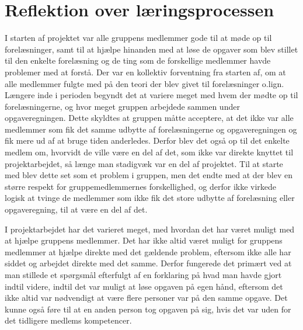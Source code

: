 \section{Reflektion over læringsprocessen}\label{Reflektion-over-laeringsprocessen}
I starten af projektet var alle gruppens medlemmer gode til at møde op til forelæsninger, samt til at hjælpe hinanden med at løse de opgaver som blev stillet til den enkelte forelæsning og de ting som de forskellige medlemmer havde problemer med at forstå. Der var en kollektiv forventning fra starten af, om at alle medlemmer fulgte med på den teori der blev givet til forelæsninger o.lign. Længere inde i perioden begyndt det at variere meget med hvem der mødte op til forelæsningerne, og hvor meget gruppen arbejdede sammen under opgaveregningen. Dette skyldtes at gruppen måtte acceptere, at det ikke var alle medlemmer som fik det samme udbytte af forelæsningerne og opgaveregningen og fik mere ud af at bruge tiden anderledes. Derfor blev det også op til det enkelte medlem om, hvorvidt de ville være en del af det, som ikke var direkte knyttet til projektarbejdet, så længe man stadigvæk var en del af projektet. Til at starte med blev dette set som et problem i gruppen, men det endte med at der blev en større respekt for gruppemedlemmernes forskellighed, og derfor ikke virkede logisk at tvinge de medlemmer som ikke fik det store udbytte af forelæsning eller opgaveregning, til at være en del af det.

\vspace{5mm}

	I projektarbejdet har det varieret meget, med hvordan det har været muligt med at hjælpe gruppens medlemmer. Det har ikke altid været muligt for gruppens medlemmer at hjælpe direkte med det gældende problem, eftersom ikke alle har siddet og arbejdet direkte med det samme. Derfor fungerede det primært ved at man stillede et spørgsmål efterfulgt af en forklaring på hvad man havde gjort indtil videre, indtil det var muligt at løse opgaven på egen hånd, eftersom det ikke altid var nødvendigt at være flere personer var på den samme opgave. Det kunne også føre til at en anden person tog opgaven på sig, hvis det var uden for det tidligere medlems kompetencer.